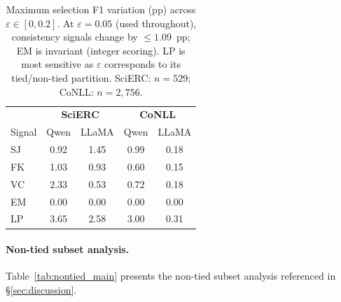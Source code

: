 \begin{table}[t]
\centering
\small
\caption{Maximum selection F1 variation (pp) across $\varepsilon \in [0, 0.2]$. At $\varepsilon{=}0.05$ (used throughout), consistency signals change by ${\leq}1.09$~pp; EM is invariant (integer scoring). LP is most sensitive as $\varepsilon$ corresponds to its tied/non-tied partition. SciERC: $n{=}529$; CoNLL: $n{=}2{,}756$.}
\label{tab:epsilon_robustness}
\begin{tabular}{lcccc}
\toprule
& \multicolumn{2}{c}{\textbf{SciERC}} & \multicolumn{2}{c}{\textbf{CoNLL}} \\
\cmidrule(lr){2-3} \cmidrule(lr){4-5}
Signal & Qwen & LLaMA & Qwen & LLaMA \\
\midrule
SJ & 0.92 & 1.45 & 0.99 & 0.18 \\
FK & 1.03 & 0.93 & 0.60 & 0.15 \\
VC & 2.33 & 0.53 & 0.72 & 0.18 \\
EM & 0.00 & 0.00 & 0.00 & 0.00 \\
LP & 3.65 & 2.58 & 3.00 & 0.31 \\
\bottomrule
\end{tabular}
\end{table}

\paragraph{Non-tied subset analysis.}
Table~\ref{tab:nontied_main} presents the non-tied subset analysis referenced in \S\ref{sec:discussion}.

\begin{table}[t]
\centering
\small
\caption{Non-tied subset analysis (SciERC, Qwen3-8B, $N{=}8$, $T{=}1.0$). Instances split at LP range $\varepsilon{=}0.05$. Within-instance $\rho$ and selection gain both concentrate in the non-tied subset. Full $\varepsilon$ sweep in Table~\ref{tab:epsilon_sweep}.}
\label{tab:nontied_main}
\end{table}

